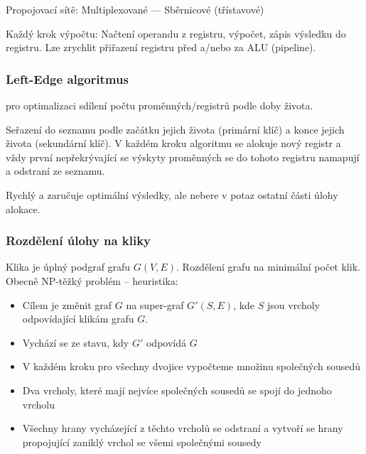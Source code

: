 \documentclass[a4paper, 11pt]{report}
\begin{document}
Propojovací sítě: Multiplexované --- Sběrnicové (třístavové)

Každý krok výpočtu: Načtení operandu z registru, výpočet, zápis výsledku do registru. Lze zrychlit přiřazení registru před a/nebo za ALU (pipeline).

\subsubsection{Left-Edge algoritmus}
pro optimalizaci sdílení počtu proměnných/registrů podle doby života.

Seřazení do seznamu podle začátku jejich života (primární klíč) a konce jejich života (sekundární klíč).
V každém kroku algoritmu se alokuje nový registr a vždy první nepřekrývající se výskyty proměnných se do tohoto registru namapují a odstraní ze seznamu.

Rychlý a zaručuje optimální výsledky, ale nebere v potaz ostatní části úlohy alokace.

\subsubsection{Rozdělení úlohy na kliky}
Klika je úplný podgraf grafu $G(V, E)$. Rozdělení grafu na minimální počet klik.
Obecně NP-těžký problém -- heuristika:
\begin{itemize}
	\item Cílem je změnit graf $G$ na super-graf $G'(S, E)$, kde $S$ jsou vrcholy odpovídající klikám grafu $G$.
	\item Vychází se ze stavu, kdy $G'$ odpovídá $G$
	\item V každém kroku pro všechny dvojice vypočteme množinu společných sousedů
	\item Dva vrcholy, které mají nejvíce společných sousedů se spojí do jednoho vrcholu
	\item Všechny hrany vycházející z těchto vrcholů se odstraní a vytvoří se hrany propojující zaniklý vrchol se všemi společnými sousedy
\end{itemize}
\end{document}
